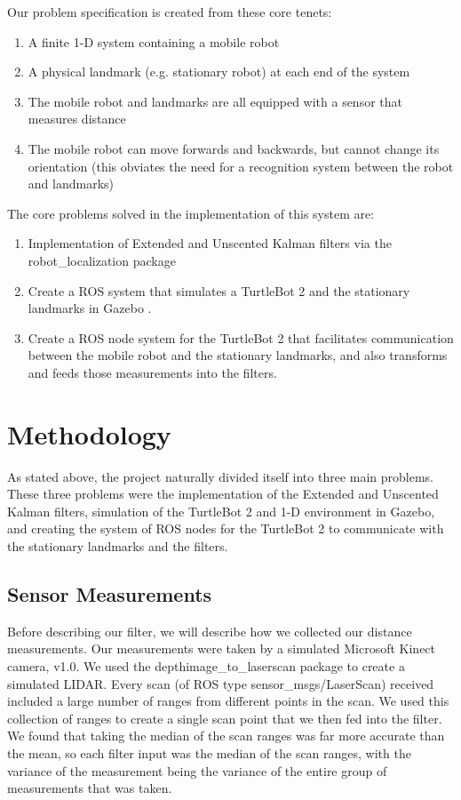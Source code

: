 \documentclass[conference]{IEEEtran}
\begin{document}
Our problem specification is created from these core tenets:
\begin{enumerate}
\item A finite 1-D system containing a mobile robot
\item A physical landmark (e.g. stationary robot) at each end of the system
\item The mobile robot and landmarks are all equipped with a sensor that measures distance
\item The mobile robot can move forwards and backwards, but cannot change its orientation (this obviates the need for a
recognition system between the robot and landmarks)
\end{enumerate}

The core problems solved in the implementation of this system are:
\begin{enumerate}
\item Implementation of Extended and Unscented Kalman filters via the robot\_localization package
\cite{robot_localization}
\item Create a ROS \cite{ros_original} system that simulates a TurtleBot 2 and the stationary landmarks in Gazebo
\cite{gazebo}.
\item Create a ROS node system for the TurtleBot 2 that facilitates communication between the mobile robot and the
stationary landmarks, and also transforms and feeds those measurements into the filters.
\end{enumerate}


\section{Methodology}
As stated above, the project naturally divided itself into three main problems. These three problems were the
implementation of the Extended and Unscented Kalman filters, simulation of the TurtleBot 2 and 1-D environment in
Gazebo, and creating the system of ROS nodes for the TurtleBot 2 to communicate with the stationary landmarks and the
filters.

\subsection{Sensor Measurements} \label{Sensor Measurements}
Before describing our filter, we will describe how we collected our distance measurements. Our measurements were taken
by a simulated Microsoft Kinect camera, v1.0. We used the depthimage\_to\_laserscan package \cite{depth_to_scan} to
create a
simulated LIDAR. Every scan (of ROS type sensor\_msgs/LaserScan) received included a large number of ranges from
different points in the scan. We used this collection of ranges to create a single scan point that we then fed into the
filter. We found that taking the median of the scan ranges was far more accurate than the mean, so each filter input
was the median of the scan ranges, with the variance of the measurement being the variance of the entire group of
measurements that was taken.
\end{document}
